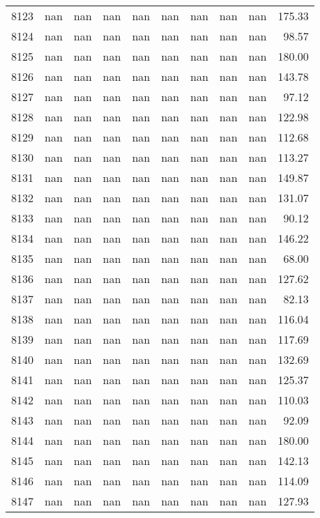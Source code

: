 \begin{tabular}{lrrrrrrrrr}
8123 & nan & nan & nan & nan & nan & nan & nan & nan & 175.33 \\
8124 & nan & nan & nan & nan & nan & nan & nan & nan & 98.57 \\
8125 & nan & nan & nan & nan & nan & nan & nan & nan & 180.00 \\
8126 & nan & nan & nan & nan & nan & nan & nan & nan & 143.78 \\
8127 & nan & nan & nan & nan & nan & nan & nan & nan & 97.12 \\
8128 & nan & nan & nan & nan & nan & nan & nan & nan & 122.98 \\
8129 & nan & nan & nan & nan & nan & nan & nan & nan & 112.68 \\
8130 & nan & nan & nan & nan & nan & nan & nan & nan & 113.27 \\
8131 & nan & nan & nan & nan & nan & nan & nan & nan & 149.87 \\
8132 & nan & nan & nan & nan & nan & nan & nan & nan & 131.07 \\
8133 & nan & nan & nan & nan & nan & nan & nan & nan & 90.12 \\
8134 & nan & nan & nan & nan & nan & nan & nan & nan & 146.22 \\
8135 & nan & nan & nan & nan & nan & nan & nan & nan & 68.00 \\
8136 & nan & nan & nan & nan & nan & nan & nan & nan & 127.62 \\
8137 & nan & nan & nan & nan & nan & nan & nan & nan & 82.13 \\
8138 & nan & nan & nan & nan & nan & nan & nan & nan & 116.04 \\
8139 & nan & nan & nan & nan & nan & nan & nan & nan & 117.69 \\
8140 & nan & nan & nan & nan & nan & nan & nan & nan & 132.69 \\
8141 & nan & nan & nan & nan & nan & nan & nan & nan & 125.37 \\
8142 & nan & nan & nan & nan & nan & nan & nan & nan & 110.03 \\
8143 & nan & nan & nan & nan & nan & nan & nan & nan & 92.09 \\
8144 & nan & nan & nan & nan & nan & nan & nan & nan & 180.00 \\
8145 & nan & nan & nan & nan & nan & nan & nan & nan & 142.13 \\
8146 & nan & nan & nan & nan & nan & nan & nan & nan & 114.09 \\
8147 & nan & nan & nan & nan & nan & nan & nan & nan & 127.93 \\

\end{tabular}
